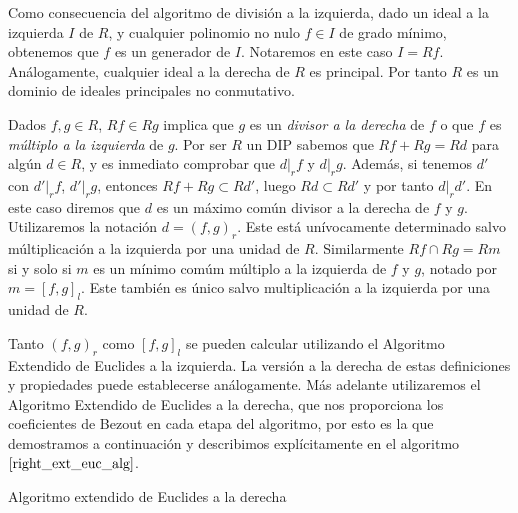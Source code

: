 Como consecuencia del algoritmo de división a la izquierda, dado un ideal a la izquierda \(I\) de \(R\), y cualquier polinomio no nulo  \(f \in I\) de grado mínimo, obtenemos que  \(f\) es un generador de  \(I\). Notaremos en este caso \(I = Rf\). Análogamente, cualquier ideal a la derecha de \(R\) es principal.  Por tanto \(R\) es un dominio de ideales principales no conmutativo.

Dados \(f,g \in R\), \(Rf \in Rg\) implica que \(g\) es un \textit{divisor a la derecha} de \(f\) o que \(f\) es \textit{múltiplo a la izquierda} de \(g\). Por ser \(R\) un DIP sabemos que \(Rf + Rg = Rd\) para algún \(d \in R\), y es inmediato comprobar que \(d |_r f\) y  \(d |_r g\). Además, si tenemos \(d'\) con \(d' |_r f\), \(d' |_r g\), entonces \(Rf + Rg \subset Rd'\), luego \(Rd \subset Rd'\) y por tanto  \(d |_r d'\). En este caso diremos que \(d\) es un máximo común divisor a la derecha de \(f\) y \(g\). Utilizaremos la notación \(d = (f,g)_r\). Este está unívocamente determinado salvo múltiplicación a la izquierda por una unidad de \(R\). Similarmente  \(Rf \cap Rg = Rm\) si y solo si \(m\) es un mínimo comúm múltiplo a la izquierda de \(f\) y \(g\), notado por \(m = [f,g]_l\). Este también es único salvo multiplicación a la izquierda por una unidad de \(R\).

Tanto \((f,g)_r\) como \([f,g]_l\) se pueden calcular utilizando el Algoritmo Extendido de Euclides a la izquierda. La versión a la derecha de estas definiciones y propiedades puede establecerse análogamente. Más adelante utilizaremos el Algoritmo Extendido de Euclides a la derecha, que nos proporciona los coeficientes de Bezout en cada etapa del algoritmo, por esto es la que demostramos a continuación y describimos explícitamente en el algoritmo \(\ref{right_ext_euc_alg}\).

\begin{algorithm}[H]
 \label{right_ext_euc_alg}
 \caption{Algoritmo extendido de Euclides a la derecha}
\end{algorithm}

